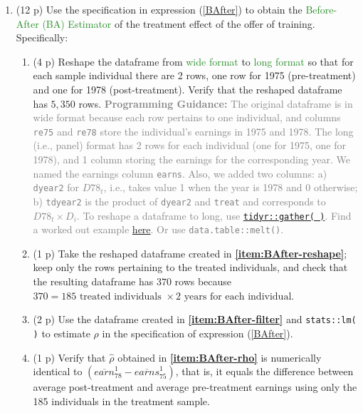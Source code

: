 \documentclass{article}
\begin{document}
\begin{enumerate}[label=\textbf{Q\arabic{enumi}}.,ref=Q\arabic{enumi}, wide=0pt, itemsep=0em, topsep=5pt, labelindent=0pt]

\item (12 p) Use the specification in expression (\ref{BAfter}) to obtain the \textcolor{ForestGreen}{Before-After (BA) Estimator} of the treatment effect of the offer of training. Specifically: \label{item:BAfter} 
\begin{enumerate}
\item (4 p) Reshape the dataframe from \textcolor{ForestGreen}{wide format} to \textcolor{ForestGreen}{long format} so that for each sample individual there are 2 rows, one row for 1975 (pre-treatment) and one for 1978 (post-treatment). Verify that the reshaped dataframe has $5,350$ rows. \textcolor{gray}{\textbf{Programming Guidance:} The original dataframe is in wide format because each row pertains to one individual, and columns \texttt{re75} and \texttt{re78} store the individual's earnings in 1975 and 1978. The long (i.e., panel) format has 2 rows for each individual (one for 1975, one for 1978), and 1 column storing the earnings for the corresponding year. We named the earnings column \texttt{earns}. Also, we added two columns: a) \texttt{dyear2} for $D78_{t}$, i.e., takes value 1 when the year is 1978 and 0 otherwise; b) \texttt{tdyear2} is the product of \texttt{dyear2} and \texttt{treat} and corresponds to $D78_t \times D_i$. To reshape a dataframe to long, use \href{https://tidyr.tidyverse.org/reference/gather.html}{\texttt{tidyr::gather( )}}. Find a worked out example \href{https://uc-r.github.io/tidyr}{here}. Or use \texttt{data.table::melt()}.}\label{item:BAfter-reshape}
\item (1 p) Take the reshaped dataframe created in \textbf{\ref{item:BAfter-reshape}}; keep only the rows pertaining to the treated individuals, and check that the resulting dataframe has $370$ rows because $370=185 \text{ treated individuals } \times 2 \text{ years for each individual}$.\label{item:BAfter-filter} 
\item (2 p) Use the dataframe created in \textbf{\ref{item:BAfter-filter}} and \texttt{stats::lm( )} to estimate $\rho$ in the specification of expression (\ref{BAfter}).\label{item:BAfter-rho}
\item (1 p) Verify that $\hat{\rho}$ obtained in \textbf{\ref{item:BAfter-rho}} is numerically identical to $\left( \overline{earn}_{78}^{1}-\overline{earns}_{75}^{1}\right)$, that is, it equals the difference between average post-treatment and average pre-treatment earnings using only the 185 individuals in the treatment sample.\label{item:BAfter-diff} 

\end{enumerate}
\end{enumerate}
\end{document}
